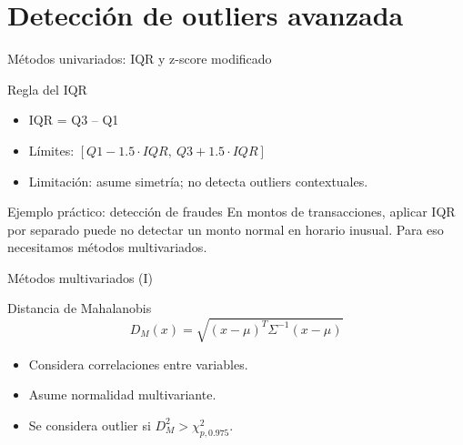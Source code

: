 \documentclass[aspectratio=169, 10pt, xcolor=table]{beamer}
\begin{document}
\section{Detección de outliers avanzada}

\begin{frame}{Métodos univariados: IQR y z-score modificado}
    \begin{block}{Regla del IQR}
        \begin{itemize}
            \item IQR = Q3 – Q1
            \item Límites: $[Q1 - 1.5\cdot IQR,\ Q3 + 1.5\cdot IQR]$
            \item Limitación: asume simetría; no detecta outliers contextuales.
        \end{itemize}
    \end{block}
    \begin{exampleblock}{Ejemplo práctico: detección de fraudes}
        En montos de transacciones, aplicar IQR por separado puede no detectar un monto normal en horario inusual. Para eso necesitamos métodos multivariados.
    \end{exampleblock}
\end{frame}

\begin{frame}{Métodos multivariados (I)}
    \begin{block}{Distancia de Mahalanobis}
        \[
        D_M(x) = \sqrt{(x-\mu)^T \Sigma^{-1}(x-\mu)}
        \]
        \begin{itemize}
            \item Considera correlaciones entre variables.
            \item Asume normalidad multivariante.
            \item Se considera outlier si $D_M^2 > \chi^2_{p,0.975}$.
        \end{itemize}
    \end{block}
\end{frame}
\end{document}

